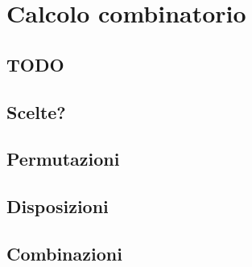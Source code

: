 
\chapter{Calcolo combinatorio}

\section{TODO}

\section{Scelte?}
\label{sec:01_scelte?}

% 

\section{Permutazioni}
\label{sec:02_permutazioni}

\section{Disposizioni}
\label{sec:03_disposizioni}

\section{Combinazioni}
\label{sec:04_combinazioni}


